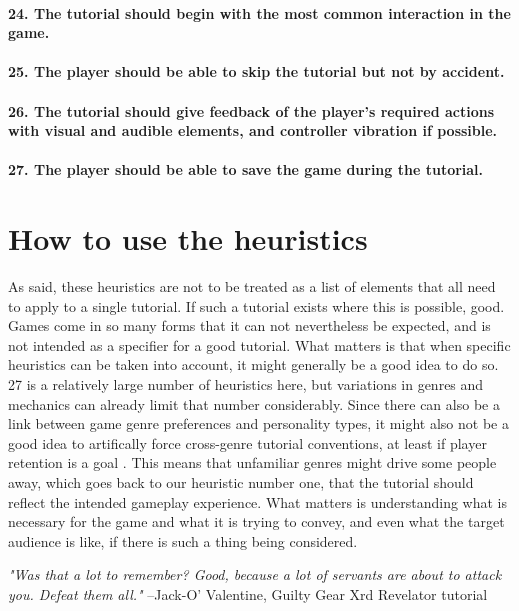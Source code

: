 \paragraph{24. The tutorial should begin with the most common interaction in the game.}
\paragraph{25. The player should be able to skip the tutorial but not by accident.}
\paragraph{26. The tutorial should give feedback of the player's required actions with visual and audible elements, and controller vibration if possible.}
\paragraph{27. The player should be able to save the game during the tutorial.}

\section{How to use the heuristics}

As said, these heuristics are not to be treated as a list of elements that all need to apply to a single tutorial. If such a tutorial exists where this is possible, good. Games come in so many forms that it can not nevertheless be expected, and is not intended as a specifier for a good tutorial. What matters is that when specific heuristics can be taken into account, it might generally be a good idea to do so. 27 is a relatively large number of heuristics here, but variations in genres and mechanics can already limit that number considerably. Since there can also be a link between game genre preferences and personality types, it might also not be a good idea to artifically force cross-genre tutorial conventions, at least if player retention is a goal \cite{Peever2012}. This means that unfamiliar genres might drive some people away, which goes back to our heuristic number one, that the tutorial should reflect the intended gameplay experience. What matters is understanding what is necessary for the game and what it is trying to convey, and even what the target audience is like, if there is such a thing being considered. 

\begin{displayquote}{\textit{"Was that a lot to remember?
Good, because a lot of servants are about to attack you.
Defeat them all."}} --Jack-O' Valentine, Guilty Gear Xrd Revelator tutorial
\end{displayquote}











